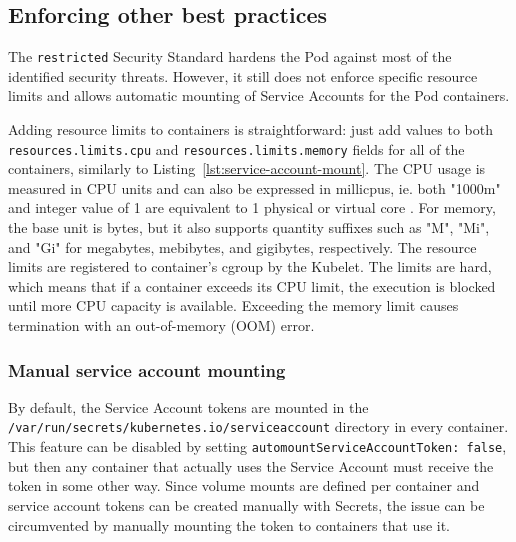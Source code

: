 \documentclass[english, 12pt, a4paper, sci, utf8, a-2b, online]{aaltothesis}
\begin{document}

\subsection{Enforcing other best practices}

The \texttt{restricted} Security Standard hardens the Pod against most of the identified security threats. However, it still does not enforce specific resource limits and allows automatic mounting of Service Accounts for the Pod containers.

Adding resource limits to containers is straightforward: just add values to both \texttt{resources.limits.cpu} and \texttt{resources.limits.memory} fields for all of the containers, similarly to Listing~\ref{lst:service-account-mount}. The CPU usage is measured in CPU units and can also be expressed in millicpus, ie. both "1000m" and integer value of 1 are equivalent to 1 physical or virtual core \cite{k8s-docs-resources}. For memory, the base unit is bytes, but it also supports quantity suffixes such as "M", "Mi", and "Gi" for megabytes, mebibytes, and gigibytes, respectively. The resource limits are registered to container's cgroup by the Kubelet. The limits are hard, which means that if a container exceeds its CPU limit, the execution is blocked until more CPU capacity is available. Exceeding the memory limit causes termination with an out-of-memory (OOM) error.

\subsubsection{Manual service account mounting}

By default, the Service Account tokens are mounted in the \texttt{/var/run/secrets/kubernetes.io/serviceaccount} directory in every container. This feature can be disabled by setting \texttt{automountServiceAccountToken: false}, but then any container that actually uses the Service Account must receive the token in some other way. Since volume mounts are defined per container and service account tokens can be created manually with Secrets, the issue can be circumvented by manually mounting the token to containers that use it.



\end{document}
